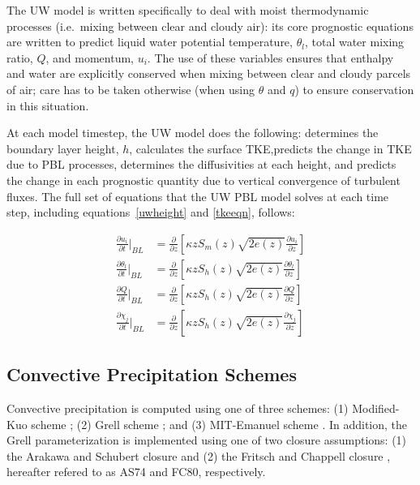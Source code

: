The UW model is written specifically to deal with moist thermodynamic processes
(i.e.~mixing between clear and cloudy air): its core prognostic equations are
written to predict liquid water potential temperature, $\theta_l$, total water
mixing ratio, $Q$, and momentum, $u_i$.  The use of these variables ensures
that enthalpy and water are explicitly conserved when mixing between clear and
cloudy parcels of air; care has to be taken otherwise (when using $\theta$ and
$q$) to ensure conservation in this situation.

At each model timestep, the UW model does the following: determines the
boundary layer height, $h$, calculates the surface TKE,predicts the change in
TKE due to PBL processes, determines the diffusivities at each height, and
predicts the change in each prognostic quantity due to vertical convergence of
turbulent fluxes.  The full set of equations that the UW PBL model solves at
each time step, including equations~\ref{uwheight} and \ref{tkeeqn}, follows:

\begin{subequations}\label{uwmodel}
\begin{align}
\frac{\partial u_i}{\partial t}\Bigr\rvert_{BL} &= \frac{\partial}{\partial z}[\kappa z S_m(z) \sqrt{2 e(z)} \frac{\partial u_i}{\partial z}]\label{uwmodela} \\
\frac{\partial \theta_l}{\partial t}\Bigr\rvert_{BL} &= \frac{\partial}{\partial z}[\kappa z S_h(z) \sqrt{2 e(z)} \frac{\partial \theta_l}{\partial z}]\label{uwmodelb} \\
\frac{\partial Q}{\partial t}\Bigr\rvert_{BL} &= \frac{\partial}{\partial z}[\kappa z S_h(z) \sqrt{2 e(z)} \frac{\partial Q}{\partial z}]\label{uwmodelc} \\
\frac{\partial \chi_j}{\partial t}\Bigr\rvert_{BL} &= \frac{\partial}{\partial z}[\kappa z S_h(z) \sqrt{2 e(z)} \frac{\partial \chi_j}{\partial z}]\label{uwmodeld} 
\end{align}
\end{subequations}


\subsection{Convective Precipitation Schemes}

Convective precipitation is computed using one of three schemes: (1)
Modified-Kuo scheme \cite{Anthes_77}; (2) Grell scheme \cite{Grell_93}; and (3)
MIT-Emanuel scheme \citep{Emanuel_91,Emanuel_99}. In addition, the Grell
parameterization is implemented using one of two closure assumptions: (1) the
Arakawa and Schubert closure \cite{Grell_94} and (2) the Fritsch and Chappell
closure \cite{Fritsch_80}, hereafter refered to as AS74 and FC80,
respectively.\\

